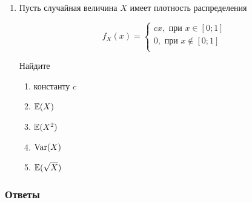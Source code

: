 \begin{enumerate}
\item Пусть случайная величина $X$ имеет плотность распределения

\[
f_X(x) =
	\begin{cases}
	cx,\text{ при }  x \in [0; 1] \\
	0,\text{ при } x \notin  [0; 1] \\
	\end{cases}
\]

Найдите
\begin{enumerate}
	\item константу $c$
	\item $\mathbb{E}(X)$
	\item $\mathbb{E}(X^2)$
	\item $\operatorname{Var}(X)$
	\item $\mathbb{E}(\sqrt{X})$
\end{enumerate}
\end{enumerate}



\subsubsection*{Ответы}

